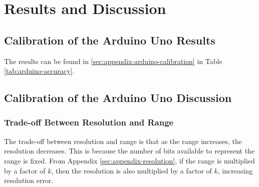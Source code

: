 \section{Results and Discussion}

\subsection{Calibration of the Arduino Uno Results}
\noindent The results can be found in \ref{sec:appendix-arduino-calibration} in Table \ref{tab:arduino-accuracy}.
\subsection{Calibration of the Arduino Uno Discussion}
\subsubsection{Trade-off Between Resolution and Range}
\noindent The trade-off between resolution and range is that as the range increases, the resolution decreases. This is because the number of bits
available to represent the range is fixed. From Appendix \ref{sec:appendix-resolution}, if the range is multiplied by a factor of $k$, then the resolution is also multiplied by a factor of $k$, increasing resolution error.

